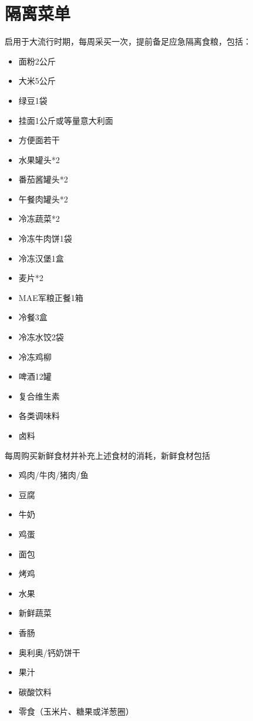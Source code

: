 \documentclass[
  letterpaper,
  DIV=11,
  numbers=noendperiod]{scrreprt}
\providecommand{\tightlist}{%
  \setlength{\itemsep}{0pt}\setlength{\parskip}{0pt}}\usepackage{longtable,booktabs,array}
\begin{document}
\section{隔离菜单}\label{ux9694ux79bbux83dcux5355}

启用于大流行时期，每周采买一次，提前备足应急隔离食粮，包括：

\begin{itemize}
\tightlist
\item
  面粉2公斤
\item
  大米5公斤
\item
  绿豆1袋
\item
  挂面1公斤或等量意大利面
\item
  方便面若干
\item
  水果罐头*2
\item
  番茄酱罐头*2
\item
  午餐肉罐头*2
\item
  冷冻蔬菜*2
\item
  冷冻牛肉饼1袋
\item
  冷冻汉堡1盒
\item
  麦片*2
\item
  MAE军粮正餐1箱
\item
  冷餐3盒
\item
  冷冻水饺2袋
\item
  冷冻鸡柳
\item
  啤酒12罐
\item
  复合维生素
\item
  各类调味料
\item
  卤料
\end{itemize}

每周购买新鲜食材并补充上述食材的消耗，新鲜食材包括

\begin{itemize}
\tightlist
\item
  鸡肉/牛肉/猪肉/鱼
\item
  豆腐
\item
  牛奶
\item
  鸡蛋
\item
  面包
\item
  烤鸡
\item
  水果
\item
  新鲜蔬菜
\item
  香肠
\item
  奥利奥/钙奶饼干
\item
  果汁
\item
  碳酸饮料
\item
  零食（玉米片、糖果或洋葱圈）
\end{itemize}
\end{document}
